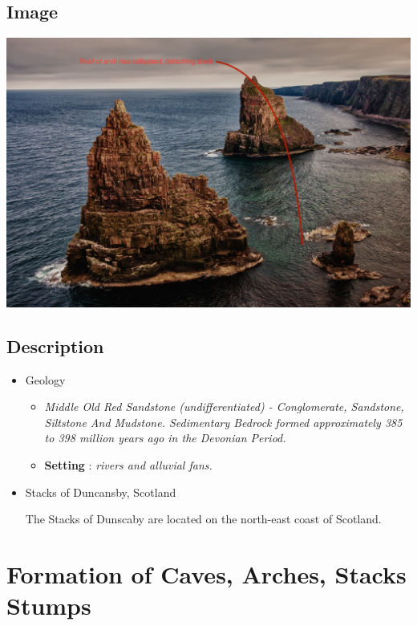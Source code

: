 \documentclass[11pt]{article}
\begin{document}
\subsection{Image}
\label{sec:orgc4ac43f}
\begin{center}
\includegraphics[width=.9\linewidth]{Images/stacks-image.jpg}
\end{center}

\subsection{Description}
\label{sec:org6415349}

\begin{itemize}
\item Geology

\begin{itemize}
\item \emph{Middle Old Red Sandstone (undifferentiated) - Conglomerate, Sandstone, Siltstone And Mudstone. Sedimentary Bedrock formed approximately 385 to 398 million years ago in the Devonian Period.}

\item \textbf{Setting} : \emph{rivers and alluvial fans.}
\end{itemize}

\item Stacks of Duncansby, Scotland

The Stacks of Dunscaby are located on the north-east coast of Scotland.
\end{itemize}

\section{Formation of Caves, Arches, Stacks Stumps}
\label{sec:orgc4625c6}
\end{document}
